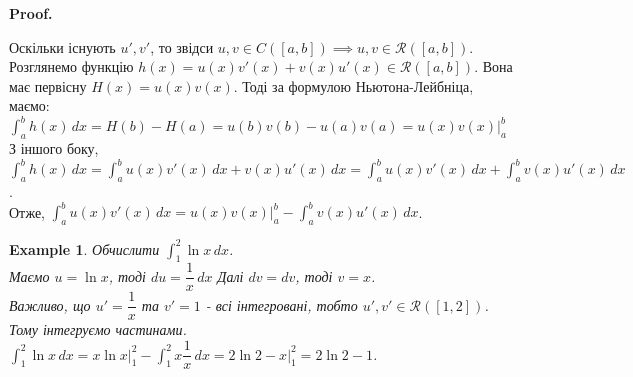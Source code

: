 \documentclass[a4paper, 10pt]{article}
\makeatletter
\def\huge{\displaystyle}
\def\qed{$\blacksquare$}
\theoremstyle{theoremdd}
\theoremstyle{theoremdd}
\theoremstyle{theoremdd}
\theoremstyle{theoremdd}
\theoremstyle{theoremdd}
\newtheorem{example}[theorem]{Example}
\theoremstyle{theoremdd}
\theoremstyle{theoremdd}
\theoremstyle{theoremdd}
\theoremstyle{theoremdd}
\renewenvironment{proof}[1][Proof.\\]{\par
\pushQED{\hfill \qed}%
\normalfont \topsep6\p@\@plus6\p@\relax
\trivlist
\item\relax
{\bfseries
#1\@addpunct{.}}\hspace\labelsep\ignorespaces
}{%
\popQED\endtrivlist\@endpefalse
}
\makeatother
\begin{document}
\begin{proof}
Оскільки існують $u',v'$, то звідси $u,v \in C([a,b]) \implies u,v \in \mathcal{R}([a,b])$.\\
Розглянемо функцію $h(x) = u(x)v'(x) + v(x)u'(x) \in \mathcal{R}([a,b])$. Вона має первісну $H(x) = u(x)v(x)$. Тоді за формулою Ньютона-Лейбніца, маємо:\\
$\huge\int_a^b h(x)\,dx = H(b)-H(a) = u(b)v(b) - u(a)v(a) = u(x)v(x) \Big|_a^b$\\
З іншого боку, $\huge\int_a^b h(x)\,dx = \int_a^b u(x)v'(x)\,dx + v(x)u'(x)\,dx = \int_a^b u(x)v'(x)\,dx + \int_a^b v(x)u'(x)\,dx$.\\
Отже, $\huge\int_a^b u(x)v'(x)\,dx = u(x)v(x) \Big|_{a}^{b} - \int_a^b v(x)u'(x)\,dx$.
\end{proof}

\begin{example}
Обчислити $\huge\int_1^2 \ln x \,dx$.\\
Маємо $u = \ln x$, тоді $du = \dfrac{1}{x}\,dx$ \hspace{1cm} Далі $dv = dv$, тоді $v = x$.\\
Важливо, що $u' = \dfrac{1}{x}$ та $v' = 1$ - всі інтегровані, тобто $u',v' \in \mathcal{R}([1,2])$. Тому інтегруємо частинами.\\
$\huge\int_1^2 \ln x \,dx = x \ln x \Big|_1^2 - \int_1^2 x \dfrac{1}{x}\,dx = 2 \ln 2 - x\Big|_1^2 = 2 \ln 2 - 1$.
\end{example}
\end{document}
